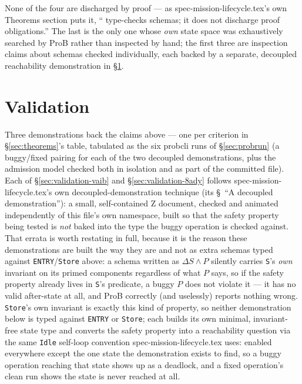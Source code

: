 \documentclass[a4paper,10pt,fleqn]{article}
\newcommand{\field}[1]{\texttt{#1}}
\begin{document}
None of the four are discharged by proof --- as
spec-mission-lifecycle.tex's own Theorems section puts it, ``\fuzz{}
type-checks schemas; it does not discharge proof obligations.'' The
last is the only one whose \emph{own} state space was exhaustively
searched by ProB rather than inspected by hand; the first three are
inspection claims about schemas checked individually, each backed by
a separate, decoupled reachability demonstration in
\S\ref{sec:validation}.

\section{Validation}
\label{sec:validation}

Three demonstrations back the claims above --- one per criterion in
\S\ref{sec:theorems}'s table, tabulated as the six probcli runs of
\S\ref{sec:probrun} (a buggy/fixed pairing for each of the two
decoupled demonstrations, plus the admission model checked both in
isolation and as part of the committed file). Each of
\S\ref{sec:validation-vaib} and \S\ref{sec:validation-8ady} follows
spec-mission-lifecycle.tex's own decoupled-demonstration technique
(its \S~``A decoupled demonstration''): a small, self-contained Z
document, checked and animated independently of this file's own
namespace, built so that the safety property being tested is
\emph{not} baked into the type the buggy operation is checked
against. That errata is worth restating in full, because it is the
reason these demonstrations are built the way they are and not as
extra schemas typed against \field{ENTRY}/\field{Store} above: a
schema written as $\Delta S \land P$ silently carries \field{S}'s
\emph{own} invariant on its primed components regardless of what $P$
says, so if the safety property already lives in \field{S}'s
predicate, a buggy $P$ does not violate it --- it has no valid
after-state at all, and ProB correctly (and uselessly) reports
nothing wrong. \field{Store}'s own invariant is exactly this kind of
property, so neither demonstration below is typed against
\field{ENTRY} or \field{Store}; each builds its own minimal,
invariant-free state type and converts the safety property into a
reachability question via the same \field{Idle} self-loop convention
spec-mission-lifecycle.tex uses: enabled everywhere except the one
state the demonstration exists to find, so a buggy operation reaching
that state shows up as a deadlock, and a fixed operation's clean run
shows the state is never reached at all.
\end{document}
